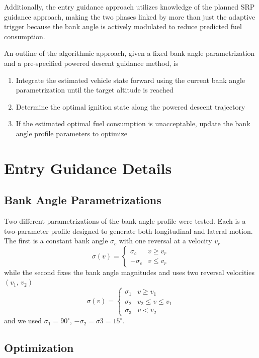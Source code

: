 \documentclass[]{article}
\begin{document}
Additionally, the entry guidance approach utilizes knowledge of the planned SRP guidance approach, making the two phases linked by more than just the adaptive trigger because the bank angle is actively modulated to reduce predicted fuel consumption. 

An outline of the algorithmic approach, given a fixed bank angle parametrization and a pre-specified powered descent guidance method, is 
\begin{enumerate}
\item Integrate the estimated vehicle state forward using the current bank angle parametrization until the target altitude is reached
\item Determine the optimal ignition state along the powered descent trajectory
\item If the estimated optimal fuel consumption is unacceptable, update the bank angle profile parameters to optimize 
\end{enumerate}


\section{Entry Guidance Details}
\subsection{Bank Angle Parametrizations}
Two different parametrizations of the bank angle profile were tested. Each is a two-parameter profile designed to generate both longitudinal and lateral motion. The first is a constant bank angle $\sigma_c$ with one reversal at a velocity $v_r$
\begin{equation}
\sigma(v) = \left\{
\begin{array}{ll}
\sigma_c & v\geq v_r \\
-\sigma_c & v\le v_r
\end{array} 
\right.
\end{equation}
while the second fixes the bank angle magnitudes and uses two reversal velocities $(v_1,\,v_2)$
\begin{equation}
\sigma(v) = \left\{
\begin{array}{ll}
\sigma_1 & v\geq v_1 \\
\sigma_2 & v_2\leq v\le v_1 \\
\sigma_3 & v< v_2
\end{array} 
\right.
\end{equation}
and we used $\sigma_1 = 90^\circ$, $-\sigma_2 = \sigma3 = 15^\circ$.
\subsection{Optimization}
\end{document}
